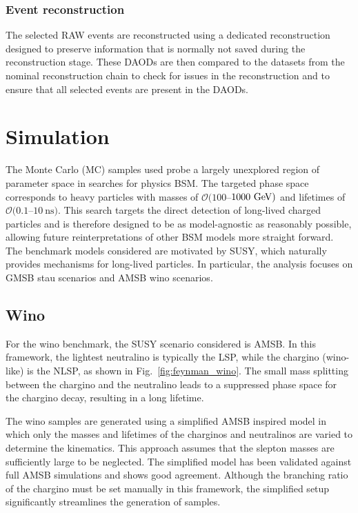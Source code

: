 \subsubsection{Event reconstruction}
The selected RAW events are reconstructed using a dedicated reconstruction designed to preserve information that is normally not saved during the reconstruction stage. 
These DAODs are then compared to the datasets from the nominal reconstruction chain to check for issues in the reconstruction and to ensure that all selected events are present in the DAODs.






\section{Simulation}
\label{sec:Simulation}
The Monte Carlo (MC) samples used probe a largely unexplored region of parameter space in searches for physics BSM.
The targeted phase space corresponds to heavy particles with masses of $\mathcal{O}(100$--$1000~\text{GeV})$ and lifetimes of $\mathcal{O}(0.1$--$10~\text{ns})$.
This search targets the direct detection of long-lived charged particles and is therefore designed to be as model-agnostic as reasonably possible, allowing future reinterpretations of other BSM models more straight forward.
The benchmark models considered are motivated by SUSY, which naturally provides mechanisms for long-lived particles.
In particular, the analysis focuses on GMSB stau scenarios and AMSB wino scenarios.


\subsection{Wino}

For the wino benchmark, the SUSY scenario considered is AMSB.
In this framework, the lightest neutralino is typically the LSP, while the chargino (wino-like) is the NLSP, as shown in Fig.~\ref{fig:feynman_wino}.
The small mass splitting between the chargino and the neutralino leads to a suppressed phase space for the chargino decay, resulting in a long lifetime.

The wino samples are generated using a simplified AMSB inspired model in which only the masses and lifetimes of the charginos and neutralinos are varied to determine the kinematics.
This approach assumes that the slepton masses are sufficiently large to be neglected.
The simplified model has been validated against full AMSB simulations and shows good agreement.
Although the branching ratio of the chargino must be set manually in this framework, the simplified setup significantly streamlines the generation of samples.

